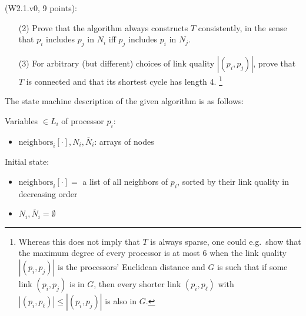 \begin{Exc}{(W2.1.v0, 9 points):}
\begin{enumerate}
\item[(2)] Prove that the algorithm always constructs $T$ consistently, in
the sense that $p_i$ includes $p_j$ in $N_i$ iff $p_j$ includes $p_i$
in $N_j$.

\item[(3)] For arbitrary (but different) choices of link quality
$|(p_i,p_j)|$, prove that $T$ is connected and that its shortest
cycle has length 4.
\footnote{Whereas this does not imply that $T$ is always sparse,
one could e.g.\ show that the maximum degree of every processor is at
most 6 when the link quality $|(p_i,p_j)|$ is the processors' Euclidean
distance and $G$ is such that if some link $(p_i,p_j)$ is
in $G$, then every shorter link $(p_i,p_\ell)$ with $|(p_i,p_\ell)|
\leq |(p_i,p_j)|$ is also in $G$.}
\end{enumerate}
\end{Exc}

The state machine description of the given algorithm is as follows:

Variables $\in L_i$ of processor $p_i$:
\begin{itemize}
\item $\text{neighbors}_i[\cdot], N_i, \overline{N}_i$: arrays of nodes
\end{itemize}

Initial state:
\begin{itemize}
\item $\text{neighbors}_i[\cdot] = $ a list of all neighbors of $p_i$, sorted by their
      link quality in decreasing order
\item $N_i, \overline{N}_i = \emptyset$
\end{itemize}

